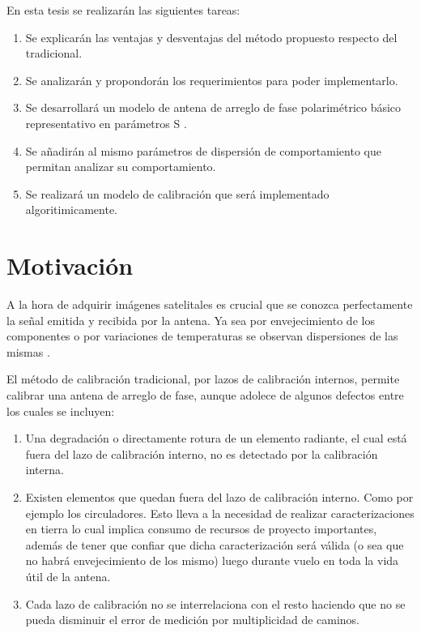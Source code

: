 En esta tesis se realizarán las siguientes tareas:

\begin{enumerate}
    \item Se explicarán las ventajas y desventajas del método propuesto respecto del tradicional.
    \item Se analizarán y propondorán los requerimientos para poder implementarlo.
    \item Se desarrollará un modelo de antena de arreglo de fase polarimétrico 
			básico representativo en parámetros S \cite{Caspers}.
    \item Se añadirán al mismo parámetros de dispersión de comportamiento que 
			permitan analizar su comportamiento.
    \item Se realizará un modelo de calibración que será implementado algoritimicamente.
\end{enumerate}



\section{Motivación}

A la hora de adquirir imágenes satelitales es crucial que se conozca perfectamente la señal emitida y recibida por la antena. 
Ya sea por envejecimiento de los componentes \cite{Agrawal2003} o por variaciones de temperaturas se observan dispersiones de 
las mismas \cite{Keizer2011}. 

El método de calibración tradicional, por lazos de calibración internos, permite calibrar una antena de arreglo de fase, aunque 
adolece de algunos defectos entre los cuales se incluyen:

\begin{enumerate}
    \item Una degradación o directamente rotura de un elemento radiante, el cual está fuera del lazo de calibración interno, no 
			es detectado por la calibración interna.
    \item Existen elementos que quedan fuera del lazo de calibración interno. Como por ejemplo los circuladores. Esto lleva a 
			la necesidad de realizar caracterizaciones en tierra lo cual implica consumo de recursos de proyecto importantes, 
			además de tener que confiar que dicha caracterización será válida (o sea que no habrá envejecimiento de los mismo) 
			luego durante vuelo en toda la vida útil de la antena.
    \item Cada lazo de calibración no se interrelaciona con el resto haciendo que no se pueda disminuir el error de medición por 
			multiplicidad de caminos.
\end{enumerate}

